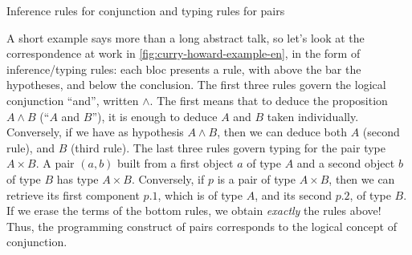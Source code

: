 \begin{marginfigure}




  
  \caption{Inference rules for conjunction and typing rules for pairs}
  \label{fig:curry-howard-example-en}
\end{marginfigure}

A short example says more than a long abstract talk, so let’s look at the correspondence
at work in \cref{fig:curry-howard-example-en}, in the form of inference/typing rules:
each bloc presents a rule, with above the bar the hypotheses, and below the conclusion.
The first three rules govern the logical conjunction “and”, written $\wedge$.
The first means that to deduce the proposition $A \wedge B$ (“$A$ and $B$”), it is enough
to deduce $A$ and $B$ taken individually.
Conversely, if we have as hypothesis $A \wedge B$, then we can deduce both $A$ (second rule),
and $B$ (third rule).
The last three rules govern typing%
for the pair type $A \times B$. A pair $(a,b)$ built
from a first object $a$ of type $A$ and a second object $b$ of type $B$ has type $A \times B$.
Conversely, if $p$ is a pair of type $A \times B$, then we can retrieve its first component
$p.1$, which is of type $A$, and its second $p.2$, of type $B$.
If we erase the terms%
of the bottom rules, we obtain \emph{exactly} the rules above!
Thus, the programming construct of pairs corresponds to the logical concept of conjunction.

